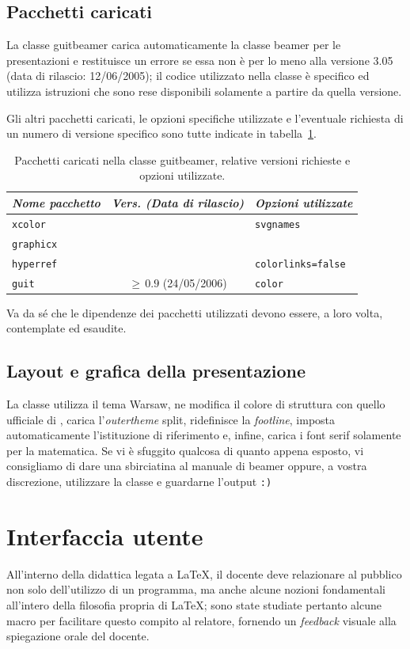 \documentclass[a4paper,10pt]{article}
\newcommand{\lcap}{{\fontencoding{T1}\selectfont\guillemotleft}}
\newcommand{\rcap}{{\fontencoding{T1}\selectfont\guillemotright}}
\newcommand{\Cap}[1]{\lcap #1\rcap}
\newcommand{\pkg}[1]{\textsf{#1}}
\let\cls\pkg
\begin{document}
\subsection{Pacchetti caricati}
La classe \cls{guitbeamer} carica automaticamente la classe
\cls{beamer} per le presentazioni e restituisce un errore se essa non
è per lo meno alla versione 3.05 (data di rilascio: 12/06/2005); il
codice utilizzato nella classe è specifico ed utilizza istruzioni che
sono rese disponibili solamente a partire da quella versione.

Gli altri pacchetti caricati, le opzioni specifiche utilizzate e
l'eventuale richiesta di un numero di versione specifico sono tutte
indicate in tabella~\ref{pacchetti}.
\begin{table}[b]\centering
  \caption{Pacchetti caricati nella classe \cls{guitbeamer}, relative
  versioni richieste e opzioni utilizzate.}\label{pacchetti}
  \medskip
  \begin{tabular}{l c l}
    \toprule
    \emph{Nome pacchetto} & \emph{Vers. (Data di rilascio)} &
    \emph{Opzioni utilizzate}\\
    \midrule
    \texttt{xcolor} & & \texttt{svgnames}\\
    \texttt{graphicx} & &\\
    \texttt{hyperref} & & \texttt{colorlinks=false}\\
    \texttt{guit} & $\ge\,0.9$ (24/05/2006)& \texttt{color}\\
    \bottomrule
  \end{tabular}
\end{table}
Va da sé che le dipendenze dei pacchetti utilizzati devono essere, a
loro volta, contemplate ed esaudite.

\subsection{Layout e grafica della presentazione}
La classe utilizza il tema \Cap{Warsaw}, ne modifica il colore di
struttura con quello ufficiale di \GuIT, carica l'\textit{outertheme}
\Cap{split}, ridefinisce la \textit{footline}, imposta automaticamente
l'istituzione di riferimento e, infine, carica i font serif solamente
per la matematica. Se vi è sfuggito qualcosa di quanto appena esposto,
vi consigliamo di dare una sbirciatina al manuale di \cls{beamer}
\cite{manbeamer} oppure, a vostra discrezione, utilizzare la
classe e guardarne l'output \texttt{:)}

\section{Interfaccia utente}
All'interno della didattica legata a \LaTeX, il docente deve
relazionare al pubblico non solo dell'utilizzo di un programma, ma
anche alcune nozioni fondamentali all'intero della filosofia propria
di \LaTeX; sono state studiate pertanto alcune macro per facilitare
questo compito al relatore, fornendo un \textit{feedback} visuale alla
spiegazione orale del docente.
\end{document}
